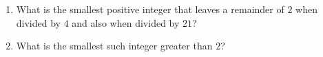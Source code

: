\begin{enumerate}
\item[(a)] What is the smallest positive integer that leaves a remainder of $2$ when divided by $4$ and also when divided by $21$?
\item[(b)] What is the smallest such integer greater than $2$?
\end{enumerate}
